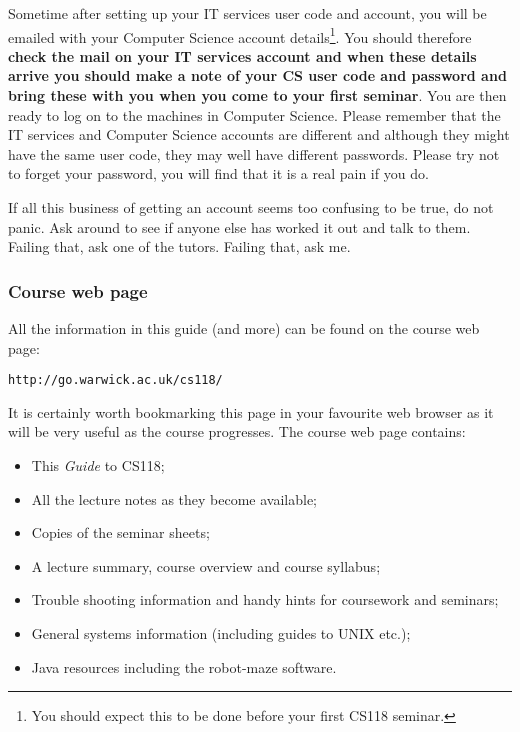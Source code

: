 Sometime after setting up your IT services user code and account, 
you will be emailed with your Computer Science account details\footnote{You 
should expect this to be done before your first CS118 seminar.}. You should 
therefore {\bf check the mail on your IT services account and when these details 
arrive you should make a note of your CS user code and password and bring these
with you when you come to your first seminar}. You are then ready to log on to the 
machines in Computer Science. Please remember that the IT services and Computer 
Science accounts are different and 
although they might have the same user code, they may well have 
different passwords. Please try not to forget your password, you will find 
that it is a real pain if you do.
 
If all this business of getting an account seems too confusing to be true, 
do not panic. Ask around to see if anyone else has worked it out and talk 
to them. Failing that, ask one of the tutors. Failing that, ask me.

\subsubsection{Course web page}

All the information in this guide (and more) can be found on the course 
web page: 

{\tt http://go.warwick.ac.uk/cs118/} 

It is certainly worth bookmarking this page in your favourite web browser 
as it will be very useful as the course progresses. The course web page 
contains:

\begin{itemize}

\item
This {\em Guide} to CS118;

\item
All the lecture notes as they become available;

\item
Copies of the seminar sheets;

\item
A lecture summary, course overview and course syllabus;

\item
Trouble shooting information and handy hints for coursework and 
seminars;

\item
General systems information (including guides to UNIX etc.);

\item
Java resources including the robot-maze software.

\end{itemize}

